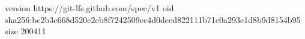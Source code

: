 version https://git-lfs.github.com/spec/v1
oid sha256:bc2b3c668d520c2eb8f7242509ec4d0deed822111b71c0a293e1d8b9d8154b95
size 200411
